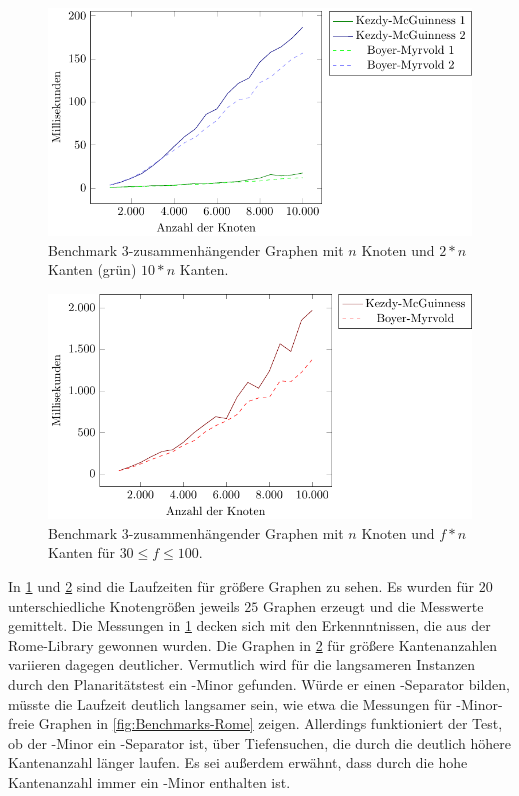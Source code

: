 \begin{figure}[H]
  \centering
  \includegraphics[width=\textwidth,height=\textheight,keepaspectratio]{plots/Benchmarks_Triconnected.pdf}
  \caption{Benchmark $3$-zusammenhängender Graphen mit $n$ Knoten und $2*n$ Kanten (grün) \bzw $10*n$ Kanten.}
  \label{fig:Benchmarks-Triconnected}
\end{figure}

\begin{figure}[H]
  \centering
  \includegraphics[width=\textwidth,height=\textheight,keepaspectratio]{plots/Benchmarks_TriconnectedVeryDense.pdf}
  \caption{Benchmark $3$-zusammenhängender Graphen mit $n$ Knoten und $f * n$ Kanten für $30 \leq f \leq 100$.}
  \label{fig:Benchmarks-Triconnected-Very-Dense}
\end{figure}

In \Abb \ref{fig:Benchmarks-Triconnected} und \Abb \ref{fig:Benchmarks-Triconnected-Very-Dense} sind die Laufzeiten für größere Graphen zu sehen.
Es wurden für $20$ unterschiedliche Knotengrößen jeweils $25$ Graphen erzeugt und die Messwerte gemittelt.
Die Messungen in \Abb \ref{fig:Benchmarks-Triconnected} decken sich mit den Erkennntnissen, die aus der Rome-Library gewonnen wurden.
Die Graphen in \Abb \ref{fig:Benchmarks-Triconnected-Very-Dense} für größere Kantenanzahlen variieren dagegen deutlicher.
Vermutlich wird für die langsameren Instanzen durch den Planaritätstest ein \kdd-Minor gefunden.
Würde er einen \dd-Separator bilden, müsste die Laufzeit deutlich langsamer sein, wie etwa die Messungen für \kf-Minor-freie Graphen in \Abb \ref{fig:Benchmarks-Rome} zeigen.
Allerdings funktioniert der Test, ob der \kdd-Minor ein \dd-Separator ist, über Tiefensuchen, die durch die deutlich höhere Kantenanzahl länger laufen.
Es sei außerdem erwähnt, dass durch die hohe Kantenanzahl immer ein \kf-Minor enthalten ist.

